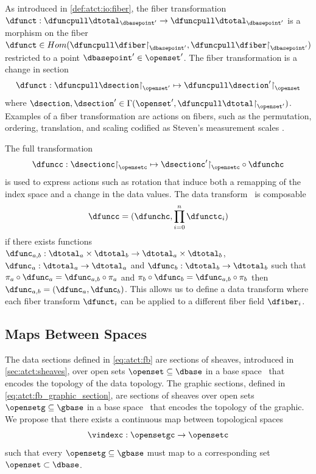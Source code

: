 \documentclass[10pt,journal,compsoc]{IEEEtran}
\renewcommand{\restriction}{\mathord{\upharpoonright}} %
\theoremstyle{definition}
\theoremstyle{remark}
\begin{document}
As introduced in \autoref{def:atct:io:fiber}, the fiber transformation $\dfunct: \dfuncpull \dtotal_{\dbasepoint^{\prime}} \rightarrow \dfuncpull \dtotal_{\dbasepoint^{\prime}}$ is a morphism on the fiber $\dfunct \in Hom(\dfuncpull\dfiber\restriction_{\dbasepoint^{\prime}},\dfuncpull\dfiber\restriction_{\dbasepoint^{\prime}})$ restricted to a point $\dbasepoint^{\prime} \in \openset^{\prime}$. The fiber transformation is a change in section 
\begin{equation}
  \label{eq:atct:morphism:fiber}
  \dfunct: \dfuncpull \dsection \restriction_{\openset^{\prime}} \mapsto \dfuncpull \dsection^{\prime} \restriction_{\openset}
\end{equation}
where $\dsection, \dsection^{\prime} \in \Gamma(\openset^{\prime}, \dfuncpull\dtotal\restriction_{\openset^{\prime}})$. Examples of a fiber transformation are actions on fibers, such as the permutation, ordering, translation, and scaling codified as Steven's measurement scales \cite{stevensTheoryScalesMeasurement1946}. 

The full transformation 
\begin{equation}
  \label{eq:atct:morphism:all}
  \dfuncc: \dsectionc\restriction_{\opensetc} \mapsto \dsectionc^{\prime}\restriction_{\opensetc} \circ \dfunchc
\end{equation}
is used to express actions such as rotation that induce both a remapping of the index space and a change in the data values. The data transform \dfunc\ is composable
\begin{equation}
  \dfuncc = (\dfunchc, \prod\limits_{i=0}^{n}\dfunctc_i)
\end{equation}
if there exists functions $\dfunc_{a,b}: \dtotal_a \times \dtotal_b \rightarrow \dtotal_a \times \dtotal_b$, $\dfunc_{a}: \dtotal_a \rightarrow \dtotal_a$ and $\dfunc_{b}: \dtotal_b \rightarrow \dtotal_b$ such that $\pi_a \circ \dfunc_a = \dfunc_{a,b} \circ \pi_a$ and $\pi_b \circ \dfunc_b = \dfunc_{a,b} \circ \pi_b$ then $\dfunc_{a,b} = (\dfunc_a, \dfunc_b)$. This allows us to define a data transform where each fiber transform $\dfunct_{i}$ can be applied to a different fiber field $\dfiber_i$. 

\subsection{Maps Between Spaces}
The data sections defined in \autoref{eq:atct:fb} are sections of sheaves, introduced in \autoref{sec:atct:sheaves}, over open sets $\openset \subseteq \dbase$ in a base space \dbase\ that encodes the topology of the data topology. The graphic sections, defined in \autoref{eq:atct:fb_graphic_section}, are sections of sheaves over open sets $\opensetg \subseteq \gbase$ in a base space \gbase\ that encodes the topology of the graphic. We propose that there exists a continuous \textcolor{functor}{map between topological spaces} \vindexc 
\begin{equation}
  \vindexc: \opensetgc \rightarrow \opensetc 
\end{equation}
such that every $\opensetg \subseteq \gbase$ must map to a corresponding set $\openset \subset \dbase$. 
\end{document}
